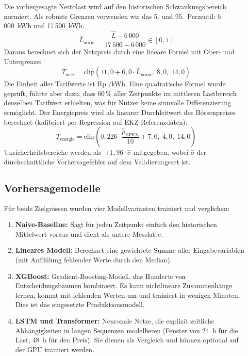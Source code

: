 \documentclass[sigconf]{acmart}
\begin{document}
Die vorhergesagte Nettolast wird auf den historischen Schwankungsbereich
normiert. Als robuste Grenzen verwenden wir das 5. und 95.~Perzentil:
6\,000~kWh und 17\,500~kWh.
\begingroup\small
\begin{equation}
  \hat{L}_{\mathrm{norm}}
  = \frac{\hat{L} - 6\,000}{17\,500 - 6\,000}
  \in [0, 1]
\end{equation}
\endgroup
Daraus berechnet sich der Netzpreis durch eine lineare Formel mit
Ober- und Untergrenze:
\begingroup\small
\begin{equation}
  T_{\mathrm{netz}} = \mathrm{clip}\!\left(
    11{,}0 + 6{,}0 \cdot \hat{L}_{\mathrm{norm}},\;
    8{,}0,\;
    14{,}0
  \right)
\end{equation}
\endgroup
Die Einheit aller Tarifwerte ist Rp./kWh.
Eine quadratische Formel wurde gepr\"uft, f\"uhrte aber dazu,
dass 60\,\% aller Zeitpunkte im mittleren Lastbereich denselben Tarifwert
erhielten, was f\"ur Nutzer keine sinnvolle Differenzierung erm\"oglicht.
Der Energiepreis wird als linearer Durchleitwert des B\"orsenpreises berechnet
(kalibriert per Regression auf EKZ-Referenzdaten):
\begingroup\small
\begin{equation}
  T_{\mathrm{energie}} = \mathrm{clip}\!\left(
    0{,}226 \cdot \frac{\hat{p}_{\mathrm{EPEX}}}{10} + 7{,}0,\;
    4{,}0,\;
    14{,}0
  \right)
\end{equation}
\endgroup
Unsicherheitsbereiche werden als~$\pm 1{,}96 \cdot \hat{\sigma}$ mitgegeben,
wobei $\hat{\sigma}$ der durchschnittliche Vorhersagefehler auf dem
Validierungsset ist.

\subsection{Vorhersagemodelle}

F\"ur beide Zielgr\"ossen wurden vier Modellvarianten trainiert und verglichen:

\begin{enumerate}
  \item \textbf{Naive-Baseline:} Sagt f\"ur jeden Zeitpunkt einfach den
        historischen Mittelwert voraus und dient als untere Messlatte.
  \item \textbf{Lineares Modell:} Berechnet eine gewichtete Summe aller
        Eingabevariablen (mit Auff\"ullung fehlender Werte durch den Median).
  \item \textbf{XGBoost:} Gradient-Boosting-Modell, das Hunderte von
        Entscheidungsb\"aumen kombiniert.
        Es kann nichtlineare Zusammenh\"ange lernen, kommt mit fehlenden
        Werten um und trainiert in wenigen Minuten.
        Dies ist das eingesetzte Produktionsmodell.
  \item \textbf{LSTM und Transformer:} Neuronale Netze, die explizit
        zeitliche Abh\"angigkeiten in langen Sequenzen modellieren
        (Fenster von 24~h f\"ur die Last, 48~h f\"ur den Preis).
        Sie dienen als Vergleich und k\"onnen optional auf der GPU trainiert werden.
\end{enumerate}
\end{document}
